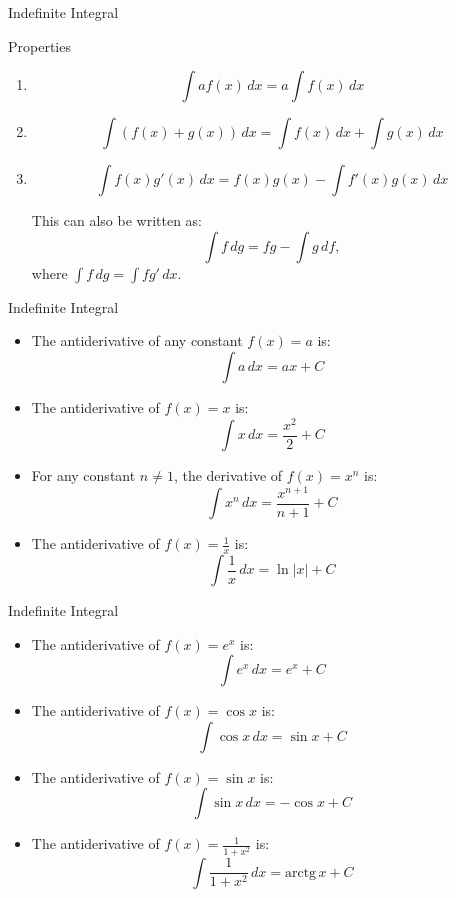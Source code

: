 \documentclass{beamer}
\begin{document}
\begin{frame}{Indefinite Integral}

    \begin{block}{Properties}
       \begin{enumerate}[<+->]
           \item \[\int af(x) \,dx = a \int  f(x) \,dx\]
           \item \[\int (f(x) + g(x)) \,dx = \int f(x) \,dx + \int g(x) \,dx\]
           \item \[\int f(x)g'(x) \, dx = f(x)g(x) - \int f'(x)g(x) \, dx\]
           
           \pause This can also be written as:
           \[
           \int f \,dg = fg - \int g \,df,
           \]
           where \(\displaystyle \int f \, dg = \int f g' \, dx \).
       \end{enumerate}
    \end{block}

\end{frame}

\begin{frame}{Indefinite Integral}
     \begin{itemize}[<+->]
         \item The antiderivative of any constant $f(x)=a$ is:
         \[\int a \, dx= ax+C\]
         \item The antiderivative of $f(x)=x$ is:
         \[\int x \,dx = \frac{x^2}{2} + C\]
         \item For any constant $n\ne 1$, the derivative of $f(x)=x^n$ is:
         \[\int x^n \,dx = \frac{x^{n+1}}{n+1} + C\]
         \item The antiderivative of $f(x)=\frac{1}{x}$ is:
         \[\int \frac{1}{x} \,dx = \ln|x| + C  \]
     \end{itemize}

\end{frame}


\begin{frame}{Indefinite Integral}
     \begin{itemize}[<+->]
         \item The antiderivative of $f(x)=e^x$ is:
         \[\int e^x \,dx = e^x + C\]
         \item The antiderivative of $f(x)=\cos x$ is:
         \[\int \cos x \,dx = \sin x + C\]
         \item The antiderivative of $f(x)=\sin x$ is:
         \[\int \sin x \,dx = -\cos x  + C\]
         \item The antiderivative of $f(x)=\frac{1}{1+x^2} $ is:
         \[\int \frac{1}{1+x^2} \,dx = \text{arctg}\, x + C  \]
     \end{itemize}

\end{frame}
\end{document}
